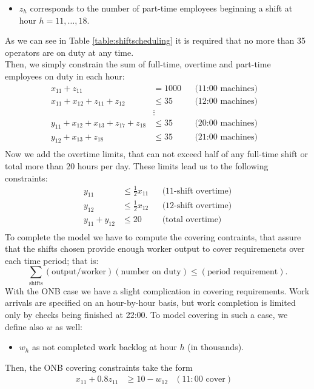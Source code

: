 \documentclass[a4paper,10 pt,titlepage,twoside]{book}
\theoremstyle{plain}
\theoremstyle{definition}
\theoremstyle{remark}
\begin{document}
{{\begin{itemize}
	\item $z_{h}$ corresponds to the number of part-time employees beginning a shift at hour $h=11, \dots, 18$.
\end{itemize}
As we can see in Table \ref{table:shiftscheduling} it is required that no more than 35 operators are on duty at any time. \\Then, we simply constrain the sum of full-time, overtime and part-time employees on duty in each hour:
\begin{align*}
x_{11}+z_{11}&= 1000&&\text{(11:00 machines)}&\\
x_{11}+x_{12}+z_{11}+z_{12}&\leq 35&&\text{(12:00 machines)}&\\
&\vdots&&\\
y_{11}+x_{12}+x_{13}+z_{17}+z_{18}&\leq35&&\text{(20:00 machines)}&\\
y_{12}+x_{13}+z_{18}&\leq35&&\text{(21:00 machines)}&\\
\end{align*}
Now we add the overtime limits, that can not exceed half of any full-time shift or total more than 20 hours per day. These limits lead us to the following constraints:
\begin{align*}
y_{11}&\leq \frac{1}{2}x_{11}&&\text{(11-shift overtime)}\\
      y_{12}&\leq \frac{1}{2}x_{12}&&\text{(12-shift overtime)}\\
y_{11}+y_{12}&\leq 20&&\text{(total overtime)}\\
\end{align*}
To complete the model we have to compute the covering contraints, that assure that the shifts chosen provide enough worker output to cover requiremenets over each time period; that is:
\begin{equation*}
\sum\limits_{\text{shifts}}(\text{output/worker})(\text{number on duty})\leq(\text{period requirement}).
\end{equation*}		
With the ONB case we have a slight complication in covering requirements. Work arrivals are specified on an hour-by-hour basis, but work completion is limited only by checks being finished at 22:00. To model covering in such a case, we define also $w$ as well:\begin{itemize}
\item $w_{h}$ as not completed work backlog at hour $h$ (in thousands).
\end{itemize}
Then, the ONB covering constraints take the form
\begin{align*}
x_{11}+0.8z_{11}&\geq 10 - w_{12}&(11:00 \text{ cover})&\\

\end{align*}}}
\end{document}

